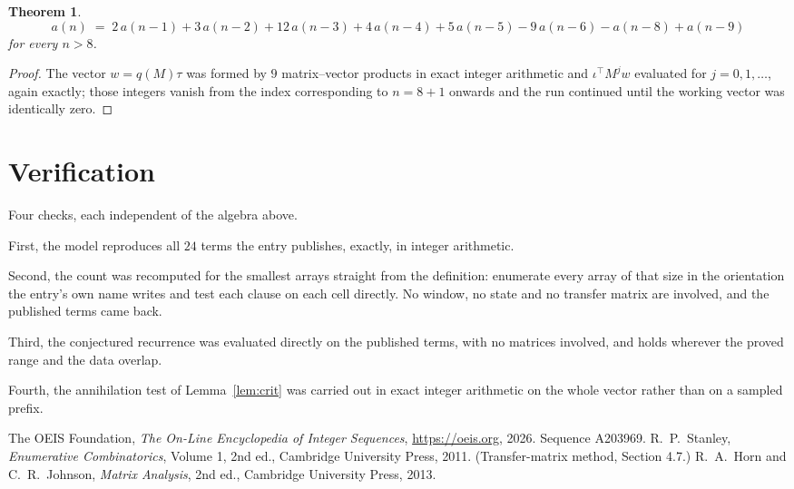 \documentclass[11pt,a4paper]{article}
\theoremstyle{plain}
\newtheorem{theorem}{Theorem}
\theoremstyle{definition}
\begin{document}
\begin{theorem}
\[
a(n)\;=\;2\,a(n-1) + 3\,a(n-2) + 12\,a(n-3) + 4\,a(n-4) + 5\,a(n-5) - 9\,a(n-6) - a(n-8) + a(n-9)
\]
for every $n>8$.
\end{theorem}

\begin{proof}
The vector $w=q(M)\tau$ was formed by $9$ matrix--vector products in exact integer
arithmetic and $\iota^{\!\top}M^{j}w$ evaluated for $j=0,1,\dots$, again exactly; those
integers vanish from the index corresponding to $n=8+1$ onwards and the run continued
until the working vector was identically zero.
\end{proof}

\section{Verification}

Four checks, each independent of the algebra above.

First, the model reproduces all $24$ terms the entry publishes, exactly, in integer
arithmetic.

Second, the count was recomputed for the smallest arrays straight from the definition:
enumerate every array of that size in the orientation the entry's own name writes and test each
clause on each cell directly. No window, no state and no transfer matrix are involved, and the
published terms came back.

Third, the conjectured recurrence was evaluated directly on the published terms, with no
matrices involved, and holds wherever the proved range and the data overlap.

Fourth, the annihilation test of Lemma~\ref{lem:crit} was carried out in exact integer
arithmetic on the whole vector rather than on a sampled prefix.

\begin{thebibliography}{9}
 The OEIS Foundation, \emph{The On-Line Encyclopedia of Integer
Sequences}, \url{https://oeis.org}, 2026. Sequence A203969.
 R.~P.~Stanley, \emph{Enumerative Combinatorics}, Volume 1, 2nd ed.,
Cambridge University Press, 2011. (Transfer-matrix method, Section 4.7.)
 R.~A.~Horn and C.~R.~Johnson, \emph{Matrix Analysis}, 2nd ed., Cambridge
University Press, 2013.
\end{thebibliography}
\end{document}
